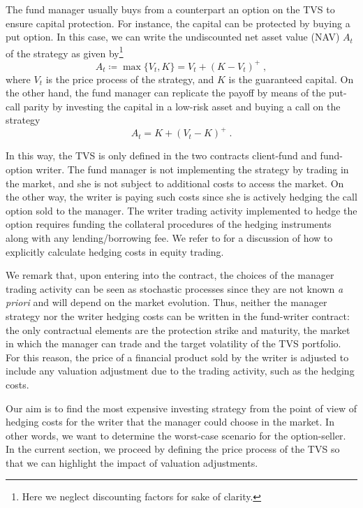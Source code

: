 \documentclass[runningheads]{m2ef}
\begin{document}
	The fund manager usually buys from a counterpart an option on the TVS to ensure capital protection. For instance, the capital can be protected by buying a put option. In this case, we can write the undiscounted net asset value (NAV) $A_t$ of the strategy as given by\footnote{Here we neglect discounting factors for sake of clarity.}
	\begin{equation}
		A_t \coloneqq \max\{V_t,K\} = V_t + (K-V_t)^+ \; ,
	\end{equation}
	where $V_t$ is the price process of the strategy, and $K$ is the guaranteed capital. On the other hand, the fund manager can replicate the payoff by means of the put-call parity by investing the capital in a low-risk asset and buying a call on the strategy
	\begin{equation}
		A_t = K + (V_t-K)^+ \; .
	\end{equation}

	In this way, the TVS is only defined in the two contracts client-fund and fund-option writer. The fund manager is not implementing the strategy by trading in the market, and she is not subject to additional costs to access the market. On the other way, the writer is paying such costs since she is actively hedging the call option sold to the manager.  The writer trading activity implemented to hedge the option requires funding the collateral procedures of the hedging instruments along with any lending/borrowing fee. We refer to \cite{Gabrielli2020} for a discussion of how to explicitly calculate hedging costs in equity trading.
		
	We remark that, upon entering into the contract,  the choices of the manager trading activity can be seen as stochastic processes since they are not known {\it a priori} and will depend on the market evolution. Thus, neither the manager strategy nor the writer hedging costs can be written in the fund-writer contract: the only contractual elements are the protection strike and maturity, the market in which the manager can trade and the target volatility of the TVS portfolio. For this reason, the price of a financial product sold by the writer is adjusted to include any valuation adjustment due to the trading activity, such as the hedging costs.

	Our aim is to find the most expensive investing strategy from the point of view of hedging costs for the writer that the manager could choose in the market. In other words, we want to determine the worst-case scenario for the option-seller. In the current section, we proceed by defining the price process of the TVS so that we can highlight the impact of valuation adjustments.
\end{document}
